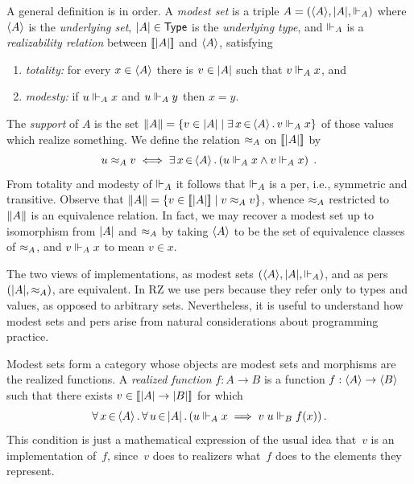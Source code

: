 A general definition is in order. A \emph{modest set} is a triple $A =
(\langle A \rangle, |A|, {\Vdash_A})$ where $\langle A \rangle$ is the
\emph{underlying set}, $|A| \in \mathsf{Type}$ is the \emph{underlying
  type}, and $\Vdash_A$ is a \emph{realizability relation} between
$[\![|A|]\!]$ and $\langle A \rangle$, satisfying
% 
\begin{enumerate}
\item \emph{totality:} for every $x \in \langle A \rangle$ there is $v \in
  |A|$ such that $v \Vdash_A x$, and
\item \emph{modesty:} if $u \Vdash_A x$ and $u \Vdash_A y$ then $x = y$.
\end{enumerate}
%
The \emph{support} of $A$ is the set $\|A\| = \{v \in
  |A| \mid \exists\, x \,{\in}\, \langle A \rangle\,.\,v \Vdash_A x\}$ of those values
which realize something. We define the relation $\approx_A$ on
$[\![|A|]\!]$ by
%
\begin{equation*}
  u \approx_A v
  \iff
  \exists\, x \,{\in}\, \langle A \rangle\,.\left(u \Vdash_A x \land v \Vdash_A x\right) \;.
\end{equation*}
%
From totality and modesty of $\Vdash_A$ it follows that $\Vdash_A$ is a per,
i.e., symmetric and transitive. Observe that $\|A\| = \{v \in
  [\![|A|]\!] \mid v \approx_A v\}$, whence $\approx_A$
restricted to $\|A\|$ is an equivalence relation. In fact, we
may recover a modest set up to isomorphism from $|A|$ and
$\approx_A$ by taking $\langle A \rangle$ to be the set of equivalence classes of
$\approx_A$, and $v \Vdash_A x$ to mean $v \in x$.

The two views of implementations, as modest sets $(\langle A \rangle,
|A|, {\Vdash_A})$, and as pers $(|A|, {\approx_A})$, are
equivalent. In RZ we use pers because they refer only to types and
values, as opposed to arbitrary sets. Nevertheless, it is useful to
understand how modest sets and pers arise from natural considerations
about programming practice.

Modest sets form a category whose objects are modest sets and
morphisms are the realized functions. A \emph{realized function} $f :
A \to B$ is a function $f : \langle A \rangle \to \langle B \rangle$ such that there
exists $v \in [\![|A| \to |B|]\!]$ for which
%
\begin{equation}
  \label{eq:rz-function-space}
  \forall\, x \,{\in}\, \langle A \rangle\,.\,
    \forall\, u \,{\in}\, |A|\,.\left(
      u \Vdash_A x \implies v\;u \Vdash_B f(x)
    \right)
 .
\end{equation}
%
This condition is just a mathematical expression of the usual idea
that~$v$ is an implementation of~$f$, since~$v$ does to realizers
what~$f$ does to the elements they represent.


